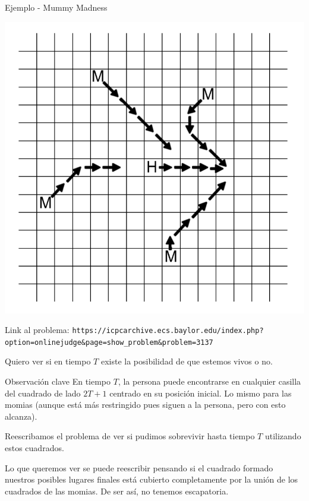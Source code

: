 \documentclass[compress]{beamer}
\newcommand{\bigpause}{\bigskip \pause}
\begin{document}
\begin{frame}{Ejemplo - Mummy Madness}

\begin{center}
\includegraphics[scale=0.2]{images/mummy_chase.png}
\end{center}

{\footnotesize
Link al problema: \texttt{https://icpcarchive.ecs.baylor.edu/index.php?option=onlinejudge\&page=show\_problem\&problem=3137}
}
\end{frame}

\begin{frame}
Quiero ver si en tiempo $T$ existe la posibilidad de que estemos vivos o no.

\begin{block}{Observación clave}
En tiempo $T$, la persona puede encontrarse en cualquier casilla del
cuadrado de lado $2T+1$ centrado en su posición inicial. Lo mismo para
las momias (aunque está más restringido pues siguen a la persona, pero
con esto alcanza).
\end{block}

Reescribamos el problema de ver si pudimos sobrevivir hasta tiempo $T$
utilizando estos cuadrados.

\end{frame}


\begin{frame}
Lo que queremos ver se puede reescribir pensando 
si el cuadrado formado nuestros posibles lugares
finales está cubierto completamente por la unión de los cuadrados de las 
momias. De ser así, no tenemos escapatoria. \\

\bigpause

\end{frame}
\end{document}
